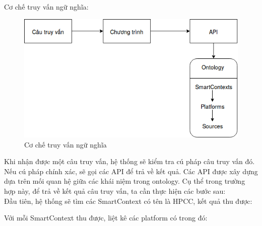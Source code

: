 Cơ chế truy vấn ngữ nghĩa: \\
\begin{figure}
	\center
	\includegraphics[scale=0.6]{image/demo}
	\caption{Cơ chế truy vấn ngữ nghĩa}
\end{figure}
Khi nhận được một câu truy vấn, hệ thống sẽ kiểm tra cú pháp câu truy vấn đó. Nếu cú pháp chính xác, sẽ gọi các API để trả về kết quả. Các API được xây dựng dựa trên mối quan hệ giữa các khái niệm trong ontology. Cụ thể trong trường hợp này, để trả về kết quả câu truy vấn, ta cần thực hiện các bước sau: \\
Đầu tiên, hệ thống sẽ tìm các SmartContext có tên là HPCC, kết quả thu được: \\

Với mỗi SmartContext thu được, liệt kê các platform có trong đó: \\

